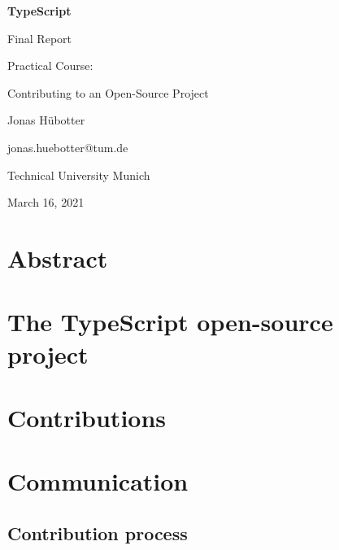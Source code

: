 \documentclass[12pt]{scrartcl}
\let\oldsection\section
\renewcommand\section{\clearpage\oldsection}
\begin{document}

\begin{titlepage}
    \begin{center}
        \vspace*{\fill}

        \Huge
        \textbf{TypeScript}

        \LARGE
        Final Report

        \vspace{0.5cm}
        \large
        Practical Course:\par
        Contributing to an Open-Source Project

        \vspace{5cm}

        Jonas Hübotter

        \small
        jonas.huebotter@tum.de

        \vspace{0.5cm}

        Technical University Munich

        March 16, 2021

        \vspace*{\fill}
    \end{center}
\end{titlepage}

\section{Abstract}

\tableofcontents{}

\section{The TypeScript open-source project}

\section{Contributions}

\section{Communication}

\subsection{Contribution process}
\end{document}

